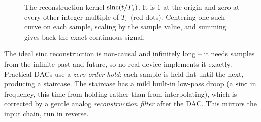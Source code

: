 \begin{figure}[H]
\centering
{}
\caption{The reconstruction kernel $\operatorname{sinc}(t/T_s)$. It is $1$ at the origin and zero at
every other integer multiple of $T_s$ (red dots). Centering one such curve on each
sample, scaling by the sample value, and summing gives back the exact continuous signal.}
\label{ch18:fig-sinc}
\end{figure}

\begin{trapbox}
The ideal sinc reconstruction is non-causal and infinitely long -- it needs samples
from the infinite past and future, so no real device implements it exactly. Practical
DACs use a \emph{zero-order hold}: each sample is held flat until the next, producing a
staircase. The staircase has a mild built-in low-pass droop (a $\operatorname{sinc}$ in frequency,
this time from holding rather than from interpolating), which is corrected by a gentle
analog \emph{reconstruction filter} after the DAC. This mirrors the input chain, run
in reverse.
\end{trapbox}

